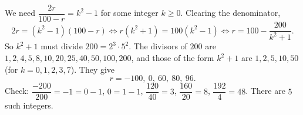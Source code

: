 We need $\dfrac{2r}{100-r}=k^2-1$ for some integer $k\ge0$. Clearing the denominator,
\[2r=\left(k^2-1\right)(100-r)\iff r\left(k^2+1\right)=100\left(k^2-1\right)\iff r=100-\dfrac{200}{k^2+1}.\]
So $k^2+1$ must divide $200=2^3\cdot5^2$. The divisors of $200$ are $1,2,4,5,8,10,20,25,40,50,100,200$, and those of the form $k^2+1$ are $1,2,5,10,50$ (for $k=0,1,2,3,7$). They give
\[r=-100,\ 0,\ 60,\ 80,\ 96.\]
Check: $\dfrac{-200}{200}=-1=0-1$, $0=1-1$, $\dfrac{120}{40}=3$, $\dfrac{160}{20}=8$, $\dfrac{192}{4}=48$. There are $\boxed{5}$ such integers.
